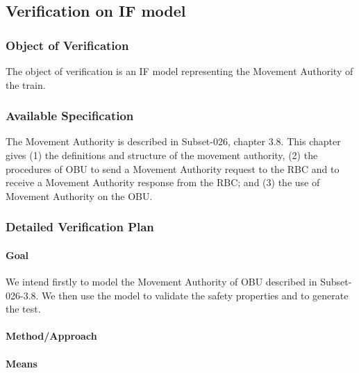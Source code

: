 \documentclass{template/openetcs_article}
\begin{document}
\subsection{Verification on IF model}
\subsubsection{Object of Verification}
The object of verification is an IF model representing the Movement Authority of
the train.

\subsubsection{Available Specification}
The Movement Authority is described in Subset-026, chapter 3.8. This chapter
gives (1) the definitions and structure of the movement authority, 
(2) the procedures of OBU to send a Movement Authority request to
the RBC and to receive a Movement Authority response from the RBC;
and (3) the use of Movement Authority on the OBU.


\subsubsection{Detailed Verification Plan}

\paragraph{Goal} 
We intend firstly to model the Movement Authority of OBU described in
Subset-026-3.8. We then use the model to validate the safety
properties and to generate the test.




\paragraph{Method/Approach}


\paragraph{Means}
\end{document}
